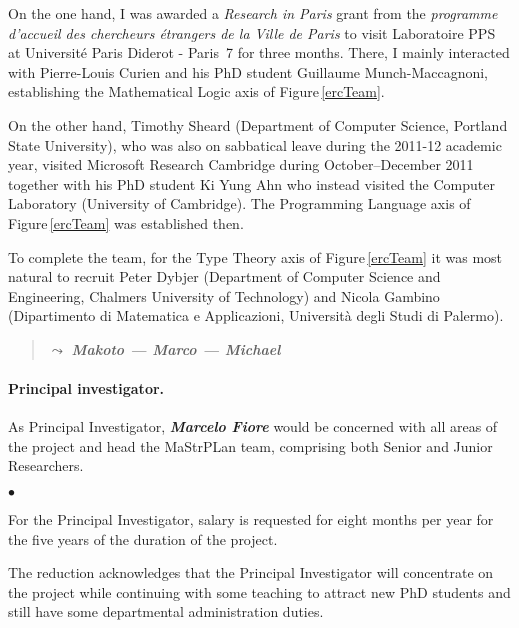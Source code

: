 \documentclass[11pt,twocolumn]{article}
\newenvironment{myitemize}
  {\begin{list}{$\bullet$}
  {\setlength{\topsep}{2pt}
   \setlength{\partopsep}{2pt}
   \setlength{\itemsep}{2.5pt}
   \setlength{\parsep}{2.5pt}
   \setlength{\leftmargin}{1em}
   \setlength{\labelwidth}{.5em}}}
  {\end{list}}
\newcommand{\erc}{{\small\sf MaStrPLan}}
\newcommand{\note}[1]{\begin{quote}{\color{blue}$\leadsto$ \bf\em
      #1}\end{quote}}
\begin{document}
On the one hand, I was awarded a \emph{Research in Paris} grant from the
\emph{programme d'accueil des chercheurs \'etrangers de la Ville de Paris}
to visit Laboratoire PPS at Universit\'e Paris Diderot - Paris~7 for three
months.  There, I mainly interacted with Pierre-Louis Curien and his PhD
student Guillaume Munch-Maccagnoni, establishing the Mathematical Logic
axis of Figure\,\ref{ercTeam}.

On the other hand, Timothy Sheard (Department of Computer Science,
Portland State University), who was also on sabbatical leave during the
2011-12 academic year, visited Microsoft Research Cambridge during
October--December 2011 together with his PhD student Ki Yung Ahn who
instead visited the Computer Laboratory (University of Cambridge).  The
Programming Language axis of Figure\,\ref{ercTeam} was established then.

To complete the team, for the Type Theory axis of Figure\,\ref{ercTeam} it
was most natural to recruit Peter Dybjer (Department of Computer Science
and Engineering, Chalmers University of Technology) and Nicola Gambino
(Dipartimento di Matematica e Applicazioni, Universit\`a degli Studi di
Palermo).  

\note{Makoto --- Marco --- Michael}

\paragraph*{Principal investigator.}

As Principal Investigator, \textbf{\em Marcelo Fiore} would be concerned
with all areas of the project and head the {\erc} team, comprising both
Senior and Junior Researchers.  
\begin{myitemize}
\item
For the Principal Investigator, salary is requested for eight months per
year for the five years of the duration of the project.  
\end{myitemize}
The reduction acknowledges that the Principal Investigator will concentrate on the project while continuing with some teaching to attract new PhD students and still have some departmental administration duties.
\end{document}
